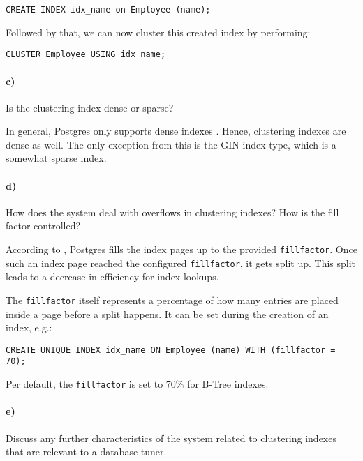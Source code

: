 \documentclass[11pt]{scrartcl}
\begin{document}
\begin{lstlisting}[style=dbtsql]
CREATE INDEX idx_name on Employee (name);
\end{lstlisting}

Followed by that, we can now cluster this created index by performing:

\begin{lstlisting}[style=dbtsql]
CLUSTER Employee USING idx_name;
\end{lstlisting}

\paragraph{c)}

Is the clustering index dense or sparse?

In general, Postgres only supports dense indexes \cite{SO_PostgresDenseSpare}.
Hence, clustering indexes are dense as well.
The only exception from this is the GIN index type, which is a somewhat sparse index.

\paragraph{d)}

How does the system deal with overflows in clustering indexes?
How is the fill factor controlled?

According to \cite{PostgreSQL2024CreateIndex}, Postgres fills the index pages up to the provided \texttt{fillfactor}.
Once such an index page reached the configured \texttt{fillfactor}, it gets split up.
This split leads to a decrease in efficiency for index lookups.

The \texttt{fillfactor} itself represents a percentage of how many entries are placed inside a page before a split happens.
It can be set during the creation of an index, e.g.:

\begin{lstlisting}[style=dbtsql]
CREATE UNIQUE INDEX idx_name ON Employee (name) WITH (fillfactor = 70);
\end{lstlisting}

Per default, the \texttt{fillfactor} is set to 70\% for B-Tree indexes.

\paragraph{e)}

Discuss any further characteristics of the system related to clustering indexes that are relevant to a database tuner.
\end{document}
